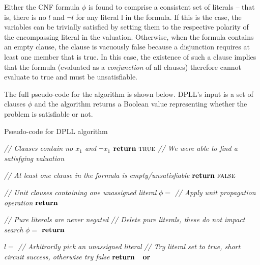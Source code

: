 \documentclass[a4paper,openany,12pt]{book}
\begin{document}
Either the CNF formula $\phi$ is found to comprise a consistent set of literals -- that is, there is no $l$ and $\neg l$
for any literal l in the formula.
If this is the case, the variables can be trivially satisfied by setting them to the respective polarity of the
encompassing literal in the valuation.
Otherwise, when the formula contains an empty clause, the clause is vacuously false because a disjunction requires at
least one member that is true.
In this case, the existence of such a clause implies that the formula (evaluated as a \emph{conjunction} of all clauses)
therefore cannot evaluate to true and must be unsatisfiable.

The full pseudo-code for the algorithm is shown below.
DPLL's input is a set of clauses $\phi$ and the algorithm returns a Boolean value representing whether the problem is
satisfiable or not.\\

\newcommand{\mycomment}[1]{\textcolor{dgrey}{\textit{// #1 }}}

\begin{algbox}{Pseudo-code for DPLL algorithm \citep{russell2016artificial}}
    \begin{algorithmic}
             \mycomment{Clauses contain no $x_1$ and $\neg x_1$}
                \State ${\bf return}~\textsc{true}$ \mycomment{We were able to find a satisfying valuation}
            \EndIf
    
             \State \mycomment{At least one clause in the formula is empty/unsatisfiable}
                \State ${\bf return}~\textsc{false}$
            \EndIf
    
             \mycomment{Unit clauses containing one unassigned literal}
                \State $\phi = $  \mycomment{Apply unit propagation operation}
                \State ${\bf return}$~
            \EndFor
    
             \mycomment{Pure literals are never negated}
                \State \mycomment{Delete pure literals, these do not impact search}
                \State $\phi = $ 
                \State ${\bf return}$~
            \EndFor
    
            \State $l = $  \State \mycomment{Arbitrarily pick an unassigned literal}
            \State \mycomment{Try literal set to true, short circuit success, otherwise try false}
            \State ${\bf return}$~~${\bf or}$~
        \EndFunction
    \end{algorithmic}
    \vspace{0.5em}
    \label{algorithm:sat:dpll}
\end{algbox}
\end{document}
